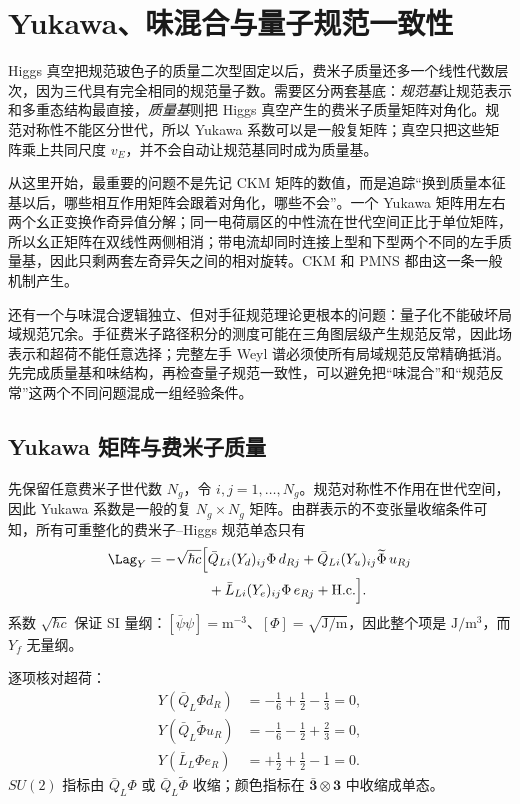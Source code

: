 \section{Yukawa、味混合与量子规范一致性}\label{sec:sm-flavor-anomaly-dp11}

Higgs 真空把规范玻色子的质量二次型固定以后，费米子质量还多一个线性代数层次，因为三代具有完全相同的规范量子数。需要区分两套基底：\emph{规范基}让规范表示和多重态结构最直接，\emph{质量基}则把 Higgs 真空产生的费米子质量矩阵对角化。规范对称性不能区分世代，所以 Yukawa 系数可以是一般复矩阵；真空只把这些矩阵乘上共同尺度 $v_E$，并不会自动让规范基同时成为质量基。

从这里开始，最重要的问题不是先记 CKM 矩阵的数值，而是追踪“换到质量本征基以后，哪些相互作用矩阵会跟着对角化，哪些不会”。一个 Yukawa 矩阵用左右两个幺正变换作奇异值分解；同一电荷扇区的中性流在世代空间正比于单位矩阵，所以幺正矩阵在双线性两侧相消；带电流却同时连接上型和下型两个不同的左手质量基，因此只剩两套左奇异矢之间的相对旋转。CKM 和 PMNS 都由这一条一般机制产生。

还有一个与味混合逻辑独立、但对手征规范理论更根本的问题：量子化不能破坏局域规范冗余。手征费米子路径积分的测度可能在三角图层级产生规范反常，因此场表示和超荷不能任意选择；完整左手 Weyl 谱必须使所有局域规范反常精确抵消。先完成质量基和味结构，再检查量子规范一致性，可以避免把“味混合”和“规范反常”这两个不同问题混成一组经验条件。

\subsection{Yukawa 矩阵与费米子质量}

\begin{definition}
先保留任意费米子世代数 $N_g$，令 $i,j=1,\ldots,N_g$。规范对称性不作用在世代空间，因此 Yukawa 系数是一般的复 $N_g\times N_g$ 矩阵。由群表示的不变张量收缩条件可知，所有可重整化的费米子--Higgs 规范单态只有
\begin{equation}
 {
 \begin{aligned}
 \Lag_Y
 =-\sqrt{\hbar c}\Big[&
 \bar Q_{Li}(Y_d)_{ij}\Phi\,d_{Rj}
 +\bar Q_{Li}(Y_u)_{ij}\widetilde\Phi\,u_{Rj}\\
 &+\bar L_{Li}(Y_e)_{ij}\Phi\,e_{Rj}
 +\mathrm{H.c.}\Big].
 \end{aligned}}
 \label{eq:sm-yukawa-general-dp11}
\end{equation}
系数 $\sqrt{\hbar c}$ 保证 SI 量纲：$[\bar\psi\psi]=\mathrm{m^{-3}}$、$[\Phi]=\sqrt{\mathrm{J/m}}$，因此整个项是 $\mathrm{J/m^3}$，而 $Y_f$ 无量纲。

逐项核对超荷：
\begin{align*}
 Y(\bar Q_L\Phi d_R)
 &=-\frac16+\frac12-\frac13=0,\\
 Y(\bar Q_L\widetilde\Phi u_R)
 &=-\frac16-\frac12+\frac23=0,\\
 Y(\bar L_L\Phi e_R)
 &=+\frac12+\frac12-1=0.
\end{align*}
$SU(2)$ 指标由 $\bar Q_L\Phi$ 或 $\bar Q_L\widetilde\Phi$ 收缩；颜色指标在 $\bar{\mathbf3}\otimes\mathbf3$ 中收缩成单态。
\end{definition}

